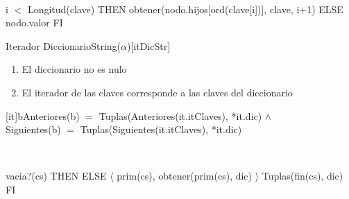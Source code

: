 \begin{Representacion}
	~


	{\IF i $<$ Longitud(clave) THEN
		obtener(nodo.hijos[ord(clave[i])], clave, i+1)
	ELSE
		nodo.valor
	FI}



	\begin{Estructura}{Iterador DiccionarioString($\alpha$)}[itDicStr]

		\begin{Tupla}[itDicStr]
		\end{Tupla}

	\end{Estructura}




	\begin{enumerate}

		\item El diccionario no es nulo

		\item El iterador de las claves corresponde a las claves del diccionario

	\end{enumerate}




	[it]{b}{Anteriores(b) $=$ Tuplas(Anteriores(it.itClaves), *it.dic) $\land$ \\ Siguientes(b) $=$ Tuplas(Siguientes(it.itClaves), *it.dic)}

	~


	{\IF vacia?(cs) THEN
		\secuvacia
	ELSE
		$\langle$ prim(cs), obtener(prim(cs), dic) $\rangle$ \puntito Tuplas(fin(cs), dic)
	FI}


\end{Representacion}

